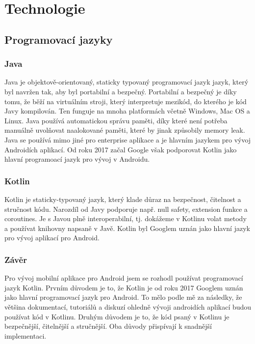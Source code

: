 \chapter{Technologie}

\setcounter{page}{1}

\section{Programovací jazyky}

\subsection{Java}

Java je objektově-orientovaný, staticky typovaný programovací jazyk  jazyk, který byl navržen tak, aby byl portabilní a bezpečný. Portabilní a bezpečný je díky tomu, že běží na virtuálním stroji, který interpretuje mezikód, do kterého je kód Javy kompilován. Ten funguje na mnoha platformách včetně Windows, Mac OS a Linux. Java používá automatickou správu paměti, díky které není potřeba manuálně uvolňovat naalokované paměti, které by jinak způsobily memory leak. Java se používá mimo jiné pro enterprise aplikace a je hlavním jazykem pro vývoj Androidích aplikací. Od roku 2017 začal Google však podporovat Kotlin jako hlavní programoací jazyk pro vývoj v Androidu. 

\subsection{Kotlin}
Kotlin je staticky-typovaný jazyk, který klade důraz na bezpečnost, čitelnost a stručnost kódu. Narozdíl od Javy podporuje např. null safety, extension funkce a coroutines. Je s Javou plně interoperabilní, tj. dokážeme v Kotlinu volat metody a používat knihovny napsaně v Javě. Kotlin byl Googlem uznán jako hlavní jazyk pro vývoj aplikací pro Android. 

\subsection{Závěr}
Pro vývoj mobilní aplikace pro Android jsem se rozhodl používat programovací jazyk Kotlin. Prvním důvodem je to, že Kotlin je od roku 2017 Googlem uznán jako hlavní programovací jazyk pro Android. To mělo podle mě za následky, že většina dokumentací, tutoriálů a diskuzí ohledně vývoji androidích aplikací budou používat kód v Kotlinu. Druhým důvodem je to, že kód psaný v Kotlinu je bezpečnější, čitelnější a stručnější. Oba důvody přispívají k snadnější implementaci.

